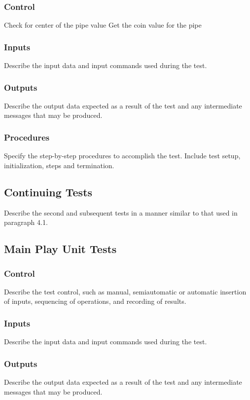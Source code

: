 \documentclass[11pt, oneside]{article}   	%
\begin{document}
\subsubsection{Control}
Check for center of the pipe value
Get the coin value for the pipe

\subsubsection{Inputs}
Describe the input data and input commands used during the test.

\subsubsection{Outputs}
Describe the output data expected as a result of the test and any intermediate messages that may be produced.

\subsubsection{Procedures}
Specify the step-by-step procedures to accomplish the test. Include test setup, initialization, steps and termination.

\subsection{Continuing Tests}
Describe the second and subsequent tests in a manner similar to that used in paragraph 4.1.

\subsection{Main Play Unit Tests}
\subsubsection{Control}
Describe the test control, such as manual, semiautomatic or automatic insertion of inputs, sequencing of operations, and recording of results.

\subsubsection{Inputs}
Describe the input data and input commands used during the test.

\subsubsection{Outputs}
Describe the output data expected as a result of the test and any intermediate messages that may be produced.
\end{document}
